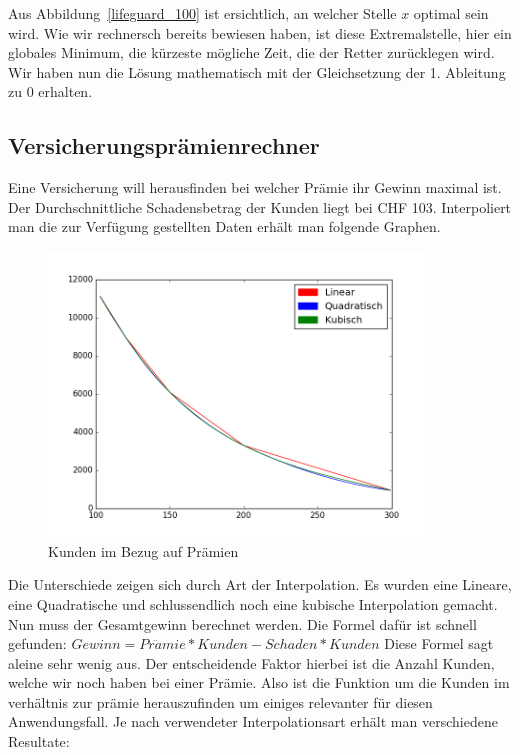 \documentclass[10pt]{article}         %
\begin{document}
Aus Abbildung~\ref{lifeguard_100} ist ersichtlich, an welcher Stelle $x$ optimal sein wird. Wie wir rechnersch bereits bewiesen haben, ist diese Extremalstelle, hier ein globales Minimum, die kürzeste mögliche Zeit, die der Retter zurücklegen wird. Wir haben nun die Lösung mathematisch mit der Gleichsetzung der 1. Ableitung zu 0 erhalten. 


\subsection{Versicherungsprämienrechner}
Eine Versicherung will herausfinden bei welcher Prämie ihr Gewinn maximal ist. Der Durchschnittliche Schadensbetrag der Kunden liegt bei CHF 103. Interpoliert man die zur Verfügung gestellten Daten erhält man folgende Graphen.
\begin{figure}[!ht]
    \centering
    \includegraphics[width=0.9\textwidth]{customres}
    \caption{Kunden im Bezug auf Prämien}\label{customers}
\end{figure}
Die Unterschiede zeigen sich durch Art der Interpolation. Es wurden eine Lineare, eine Quadratische und schlussendlich noch eine kubische Interpolation gemacht. \\
Nun muss der Gesamtgewinn berechnet werden. Die Formel dafür ist schnell gefunden: $Gewinn = Pr\ddot{a}mie * Kunden - Schaden*Kunden$ Diese Formel sagt aleine sehr wenig aus. Der entscheidende Faktor hierbei ist die Anzahl Kunden, welche wir noch haben bei einer Prämie. Also ist die Funktion um die Kunden im verhältnis zur prämie herauszufinden um einiges relevanter für diesen Anwendungsfall.
Je nach verwendeter Interpolationsart erhält man verschiedene Resultate: \\
\end{document}
